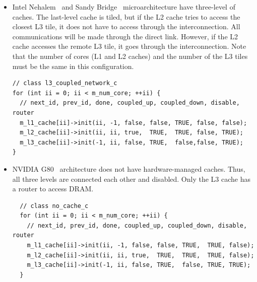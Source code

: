\begin{itemize}

  \item Intel Nehalem~\cite{nehalem} and Sandy
  Bridge~\cite{sandybridge} microarchitecture have three-level of
  caches. The last-level cache is tiled, but if the L2 cache tries to
  access the closest L3 tile, it does not have to access through the
  interconnection. All communications will be made through the direct
  link. However, if the L2 cache accesses the remote L3 tile, it goes
  through the interconnection. Note that the number of cores (L1 and
  L2 caches) and the number of the L3 tiles must be the same in this
  configuration.

\begin{Verbatim}
// class l3_coupled_network_c
for (int ii = 0; ii < m_num_core; ++ii) {
  // next_id, prev_id, done, coupled_up, coupled_down, disable, router
  m_l1_cache[ii]->init(ii, -1, false, false, TRUE, false, false);
  m_l2_cache[ii]->init(ii, ii, true,  TRUE,  TRUE, false, TRUE);
  m_l3_cache[ii]->init(-1, ii, false, TRUE,  false,false, TRUE);
}
\end{Verbatim}

  \item NVIDIA G80~\cite{g80} architecture does not have
  hardware-managed caches. Thus, all three levels are connected each
  other and disabled. Only the L3 cache has a router to access DRAM.

  \begin{Verbatim}
  // class no_cache_c
  for (int ii = 0; ii < m_num_core; ++ii) {
    // next_id, prev_id, done, coupled_up, coupled_down, disable, router
    m_l1_cache[ii]->init(ii, -1, false, false, TRUE,  TRUE, false);
    m_l2_cache[ii]->init(ii, ii, true,  TRUE,  TRUE,  TRUE, false);
    m_l3_cache[ii]->init(-1, ii, false, TRUE,  false, TRUE, TRUE);
  }
  \end{Verbatim}


\end{itemize}
